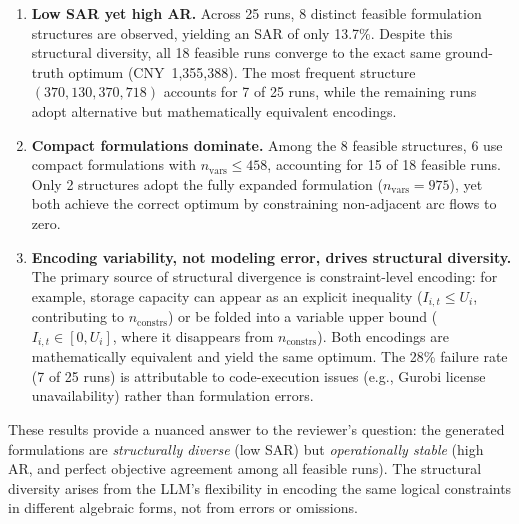 \documentclass[11pt,a4paper]{article}
\begin{document}
\begin{enumerate}
    \item \textbf{Low SAR yet high AR.} Across 25 runs, 8 distinct feasible formulation structures are observed, yielding an SAR of only 13.7\%. Despite this structural diversity, all 18 feasible runs converge to the exact same ground-truth optimum (CNY~1,355,388). The most frequent structure $(370, 130, 370, 718)$ accounts for 7 of 25 runs, while the remaining runs adopt alternative but mathematically equivalent encodings.

    \item \textbf{Compact formulations dominate.} Among the 8 feasible structures, 6 use compact formulations with $n_{\text{vars}} \leq 458$, accounting for 15 of 18 feasible runs. Only 2 structures adopt the fully expanded formulation ($n_{\text{vars}} = 975$), yet both achieve the correct optimum by constraining non-adjacent arc flows to zero.

    \item \textbf{Encoding variability, not modeling error, drives structural diversity.} The primary source of structural divergence is constraint-level encoding: for example, storage capacity can appear as an explicit inequality ($I_{i,t} \leq U_i$, contributing to $n_{\text{constrs}}$) or be folded into a variable upper bound ($I_{i,t} \in [0, U_i]$, where it disappears from $n_{\text{constrs}}$). Both encodings are mathematically equivalent and yield the same optimum. The 28\% failure rate (7 of 25 runs) is attributable to code-execution issues (e.g., Gurobi license unavailability) rather than formulation errors.
\end{enumerate}

These results provide a nuanced answer to the reviewer's question: the generated formulations are \emph{structurally diverse} (low SAR) but \emph{operationally stable} (high AR, and perfect objective agreement among all feasible runs). The structural diversity arises from the LLM's flexibility in encoding the same logical constraints in different algebraic forms, not from errors or omissions.
\end{document}
